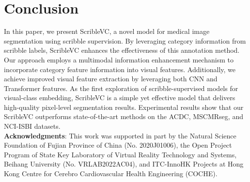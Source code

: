 \documentclass[sigconf,natbib=false]{acmart}
\begin{document}
\section{Conclusion}
In this paper, we present ScribleVC, a novel model for medical image segmentation using scribble supervision. By leveraging category information from scribble labels, ScribleVC enhances the effectiveness of this annotation method. Our approach employs a multimodal information enhancement mechanism to incorporate category feature information into visual features. Additionally, we achieve improved visual feature extraction by leveraging both CNN and Transformer features. As the first exploration of scribble-supervised models for visual-class embedding, ScribleVC is a simple yet effective model that delivers high-quality pixel-level segmentation results. Experimental results show that our ScribleVC outperforms state-of-the-art methods on the ACDC, MSCMRseg, and NCI-ISBI datasets.\\
\noindent\textbf{Acknowledgments}: This work was supported in part by the Natural Science Foundation of Fujian Province of China (No. 2020J01006), the Open Project Program of State Key Laboratory of Virtual Reality Technology and Systems, Beihang University (No. VRLAB2022AC04), and ITC-InnoHK Projects at Hong Kong Centre for Cerebro Cardiovascular Health Engineering (COCHE).


\printbibliography
\end{document}
